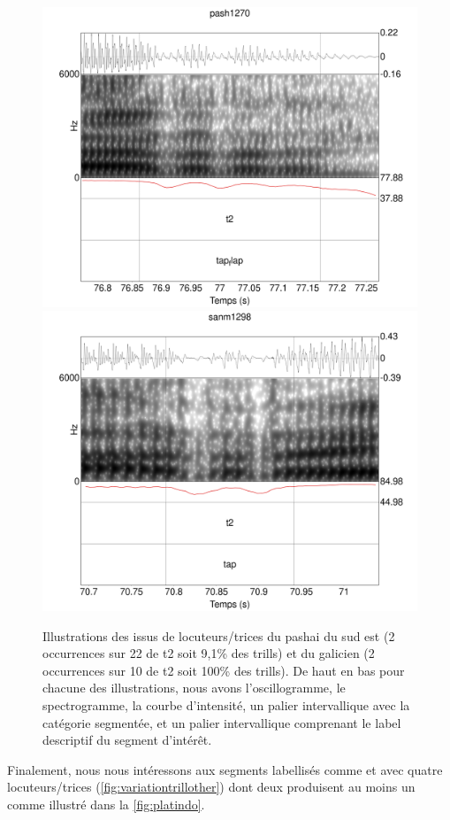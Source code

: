 \begin{figure}
	\centering
	\includegraphics[width=0.45\linewidth]{substance/spectro_images/pash1270_1400_28}
	\includegraphics[width=0.45\linewidth]{substance/spectro_images/sanm1298_1558_6}
	\caption[Illustrations des  issus de 2 locuteurs/trices]{Illustrations des  issus de locuteurs/trices
		du pashai du sud est  (2 occurrences sur 22 de t2 soit 9,1\% des trills) et 
		du galicien  (2 occurrences sur 10 de t2 soit 100\% des trills). De haut en bas pour chacune des illustrations, nous avons l'oscillogramme, le spectrogramme, la courbe d'intensité, un palier intervallique avec la catégorie segmentée, et un palier intervallique comprenant le label descriptif du segment d'intérêt.}
	\label{fig:pashsanm}
\end{figure}


Finalement, nous nous intéressons aux segments labellisés comme  et  avec quatre locuteurs/trices (\autoref{fig:variationtrillother}) dont deux produisent au moins un  comme illustré dans la \autoref{fig:platindo}.

